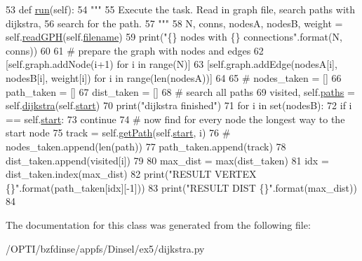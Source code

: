 \begin{DoxyCode}
53     \textcolor{keyword}{def }\hyperlink{classdijkstra_1_1Dijsktra_a291840e7c5018d10dc75cf4a2f322b4c}{run}(self):
54         \textcolor{stringliteral}{"""}
55 \textcolor{stringliteral}{        Execute the task. Read in graph file, search paths with dijkstra,}
56 \textcolor{stringliteral}{        search for the path.}
57 \textcolor{stringliteral}{        """}
58         N, conns, nodesA, nodesB, weight = self.\hyperlink{classdijkstra_1_1Dijsktra_a8e0d20b4b73b58dc2198b425f0d71fc5}{readGPH}(self.\hyperlink{classdijkstra_1_1Dijsktra_aed1c81c8ef8ea8b4ef1a8ee7379e4625}{filename})
59         print(\textcolor{stringliteral}{"\{\} nodes with \{\} connections"}.format(N, conns))
60 
61         \textcolor{comment}{# prepare the graph with nodes and edges}
62         [self.graph.addNode(i+1) \textcolor{keywordflow}{for} i \textcolor{keywordflow}{in} range(N)]
63         [self.graph.addEdge(nodesA[i], nodesB[i], weight[i]) \textcolor{keywordflow}{for} i \textcolor{keywordflow}{in} range(len(nodesA))]
64 
65         \textcolor{comment}{# nodes\_taken = []}
66         path\_taken = []
67         dist\_taken = []
68         \textcolor{comment}{# search all paths}
69         visited, self.\hyperlink{classdijkstra_1_1Dijsktra_ad69d7add778f77ed6d5ef2bbb92215e7}{paths} = self.\hyperlink{classdijkstra_1_1Dijsktra_a851d3a005118bd06bbf7bebc15e2888f}{dijkstra}(self.\hyperlink{classdijkstra_1_1Dijsktra_a2c085616618ce62ff5635493437a1f42}{start})
70         print(\textcolor{stringliteral}{"dijkstra finished"})
71         \textcolor{keywordflow}{for} i \textcolor{keywordflow}{in} set(nodesB):
72             \textcolor{keywordflow}{if} i == self.\hyperlink{classdijkstra_1_1Dijsktra_a2c085616618ce62ff5635493437a1f42}{start}:
73                 \textcolor{keywordflow}{continue}
74             \textcolor{comment}{# now find for every node the longest way to the start node}
75             track = self.\hyperlink{classdijkstra_1_1Dijsktra_a84fe73d0daafeb326e01196ab4ddf366}{getPath}(self.\hyperlink{classdijkstra_1_1Dijsktra_a2c085616618ce62ff5635493437a1f42}{start}, i)
76             \textcolor{comment}{# nodes\_taken.append(len(path))}
77             path\_taken.append(track)
78             dist\_taken.append(visited[i])
79 
80         max\_dist = max(dist\_taken)
81         idx = dist\_taken.index(max\_dist)
82         print(\textcolor{stringliteral}{"RESULT VERTEX \{\}"}.format(path\_taken[idx][-1]))
83         print(\textcolor{stringliteral}{"RESULT DIST \{\}"}.format(max\_dist))
84 
\end{DoxyCode}


The documentation for this class was generated from the following file\+:\begin{DoxyCompactItemize}
\item 
/\+O\+P\+T\+I/bzfdinse/appfs/\+Dinsel/ex5/dijkstra.\+py\end{DoxyCompactItemize}
